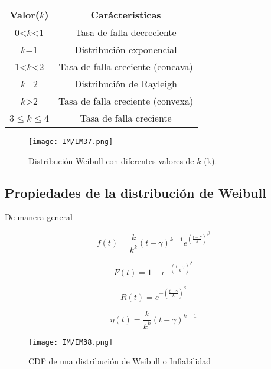 \documentclass[
	12pt, %
	fleqn, %
	a4paper, %
	oneside, %
]{LegrandOrangeBook}
\begin{document}
\begin{table}[H]
\begin{center}
\begin{tabular}{|c|c|}
\hline
\rowcolor[HTML]{EFEFEF} 
Valor($k$)    & Carácteristicas                   \\ \hline
0<$k$<1       & Tasa de falla decreciente         \\ \hline
$k$=1         & Distribución exponencial          \\ \hline
1<$k$<2       & Tasa de falla creciente (concava) \\ \hline
$k$=2         & Distribución de Rayleigh          \\ \hline
$k$>2         & Tasa de falla creciente (convexa) \\ \hline
3$\leq k\leq$4 & Tasa de falla creciente           \\ \hline
\end{tabular}
\end{center}
\end{table}
\begin{figure}[H]
\centering
\texttt{[image: IM/IM37.png]}
\caption{Distribución Weibull con diferentes valores de $k$ (k).}
\end{figure}
\subsection*{Propiedades de la distribución de Weibull}
De manera general
\begin{corollary}[Distribución]
\begin{equation}
f(t)=\frac{k}{k^k}(t-\gamma)^{k-1}e^{\left(\frac{t-\gamma}{k}\right)^{\beta}}
\end{equation}
\end{corollary}
\begin{corollary}[Infiabilidad]
\begin{equation}
F(t)=1-e^{-\left(\frac{t-\gamma}{k}\right)^{\beta}}
\end{equation}
\end{corollary}
\begin{corollary}[Confiabilidad]
\begin{equation}
R(t)=e^{-\left(\frac{t-\gamma}{k}\right)^{\beta}}
\end{equation}
\end{corollary}
\begin{corollary}
\begin{equation}
\eta (t)=\frac{k}{k^k}(t-\gamma)^{k-1}
\end{equation}
\end{corollary}
\begin{figure}[H]
\centering
\texttt{[image: IM/IM38.png]}
\caption{CDF de una distribución de Weibull o Infiabilidad}
\end{figure}
\newpage
\end{document}
